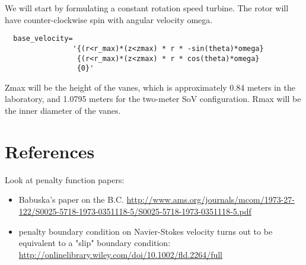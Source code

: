\documentclass{article}
\begin{document}
We will start by formulating a constant rotation speed
turbine. The rotor will have counter-clockwise spin with angular
velocity omega.   

\begin{verbatim}
  base_velocity=
                '{(r<r_max)*(z<zmax) * r * -sin(theta)*omega}
                 {(r<r_max)*(z<zmax) * r * cos(theta)*omega}
                 {0}'
\end{verbatim}

Zmax will be the height of the vanes, which is approximately 0.84 meters in the laboratory, 
and 1.0795 meters for the two-meter SoV configuration. Rmax will be the inner diameter of the vanes. 

%

\section{References}
Look at penalty function papers: 
\begin{itemize}
 \item Babuska's paper on the B.C. \url{http://www.ams.org/journals/mcom/1973-27-122/S0025-5718-1973-0351118-5/S0025-5718-1973-0351118-5.pdf}
 \item penalty boundary condition on Navier-Stokes velocity turns out to be equivalent to a "slip" boundary condition: \url{http://onlinelibrary.wiley.com/doi/10.1002/fld.2264/full}
\end{itemize}
\end{document}
